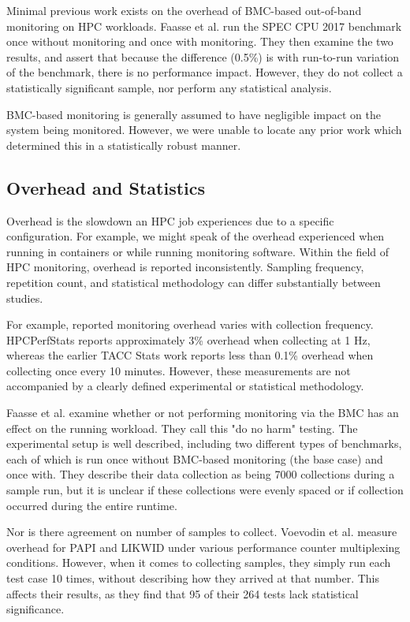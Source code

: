 \documentclass[conference]{IEEEtran}
\begin{document}
Minimal previous work exists on the overhead of BMC-based out-of-band monitoring on HPC 
workloads. Faasse et al.\cite{faasseOutBandPerformance2020} run 
the SPEC CPU 2017 benchmark once without monitoring and once with monitoring. 
They then examine the two results, and 
assert that because the difference (0.5\%) is with run-to-run variation of the 
benchmark, there is no performance impact. 
However, they do not collect a 
statistically significant sample, nor perform any statistical analysis.

BMC-based monitoring is generally assumed to have negligible impact on the 
system being monitored. However, we were unable to locate any prior work which
determined this in a statistically robust manner.

\subsection{Overhead and Statistics}
Overhead is the slowdown an HPC job experiences due to a specific configuration. 
For example, we might speak of the overhead experienced when running in 
containers\cite{rezendeallesAssessingComputationCommunication2018} or while 
running monitoring software\cite{boehmeCaliperPerformanceIntrospection2016}. 
Within the field of HPC monitoring, overhead is reported inconsistently. Sampling
frequency, repetition count, and statistical methodology can differ substantially between studies.

For example, reported monitoring overhead varies with collection frequency.
HPCPerfStats\cite{TACCHPCPerfStats2026} reports approximately 3\% overhead when
collecting at 1 Hz, whereas the earlier TACC Stats work reports less than 0.1\%
overhead when collecting once every 10 minutes\cite{evansComprehensiveResourceUse2014}.
However, these measurements are not accompanied by a clearly defined experimental or statistical methodology.

Faasse et al. \cite{faasseOutBandPerformance2020} examine
whether or not performing monitoring via the BMC has an effect on the running 
workload. They call this "do no harm" testing. The experimental setup is well
described, including two different types of benchmarks, each of which is run 
once without BMC-based monitoring (the base case) and once with. They describe
their data collection as being 7000 collections during a sample run, but
it is unclear if these collections were evenly spaced or if collection occurred
during the entire runtime.

Nor is there agreement on number of samples to collect.
Voevodin et al.\cite{voevodinOverheadAnalysisPerformance2022} 
measure overhead for PAPI and LIKWID under various performance counter 
multiplexing conditions.
However, when it comes to collecting samples, they simply run each test case 10
times, without describing how they arrived at that number. This affects their
results, as they find that 95 of their 264 tests lack statistical significance.
\end{document}
